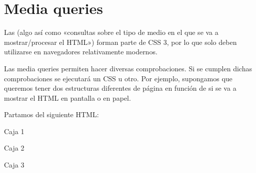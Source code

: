 \documentclass[letterpaper,10pt,spanish]{sphinxmanual}
\begin{document}
\begin{sphinxVerbatim}[commandchars=\\\{\}]
      
        
       
      
        
       
\end{sphinxVerbatim}


\section{Media queries}
\label{\detokenize{tema3:media-queries}}
Las  (algo así como «consultas sobre el tipo de medio en el que se va a mostrar/procesar el HTML») forman parte de CSS 3, por lo que solo deben utilizarse en navegadores relativamente modernos.

Las media queries permiten hacer diversas comprobaciones. Si se cumplen dichas comprobaciones se ejecutará un CSS u otro. Por ejemplo, supongamos que queremos tener dos estructuras diferentes de página en función de si se va a mostrar el HTML en pantalla o en papel.

Partamos del siguiente HTML:

\begin{sphinxVerbatim}[commandchars=\\\{\}]
 
    Caja 1

 
    Caja 2

 
    Caja 3
\end{sphinxVerbatim}
\end{document}
